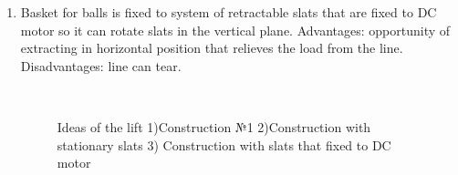 \begin{enumerate}
\begin{enumerate}
\begin{enumerate}
\begin{enumerate}
	      \item Basket for balls is fixed to system of retractable slats that are fixed to DC motor so it can rotate slats in the vertical plane. Advantages: opportunity of extracting in horizontal position that relieves the load from the line. Disadvantages: line can tear.
	      \begin{figure}[H]
	      	\begin{minipage}[h]{0.2\linewidth}
	      		\center  
	      	\end{minipage}
	      	\begin{minipage}[h]{0.6\linewidth}
	      		\caption{Ideas of the lift 1)Construction №1 2)Construction with stationary slats 3) Construction with slats that fixed to DC motor}
	      	\end{minipage}
	      \end{figure}
	      

\end{enumerate}
\end{enumerate}
\end{enumerate}
\end{enumerate}
